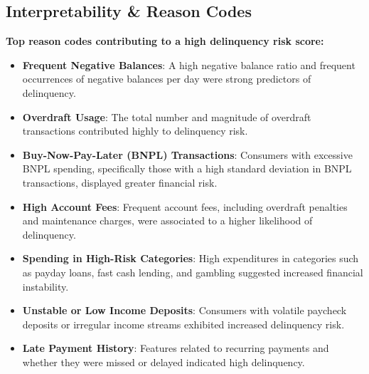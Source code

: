\documentclass[12pt,letterpaper]{article}
\begin{document}

\subsection{Interpretability \& Reason Codes}

\textbf{Top reason codes contributing to a high delinquency risk score:}

\begin{itemize}
    \item \textbf{Frequent Negative Balances}: A high negative balance ratio and frequent occurrences of negative balances per day were strong predictors of delinquency.

    \item \textbf{Overdraft Usage}: The total number and magnitude of overdraft transactions contributed highly to delinquency risk.

    \item \textbf{Buy-Now-Pay-Later (BNPL) Transactions}: Consumers with excessive BNPL spending, specifically those with a high standard deviation in BNPL transactions, displayed greater financial risk.

    \item \textbf{High Account Fees}: Frequent account fees, including overdraft penalties and maintenance charges, were associated to a higher likelihood of delinquency.

    \item \textbf{Spending in High-Risk Categories}: High expenditures in categories such as payday loans, fast cash lending, and gambling suggested increased financial instability.

    \item \textbf{Unstable or Low Income Deposits}: Consumers with volatile paycheck deposits or irregular income streams exhibited increased delinquency risk.

    \item \textbf{Late Payment History}: Features related to recurring payments and whether they were missed or delayed indicated high delinquency.

\end{itemize}
\end{document}
